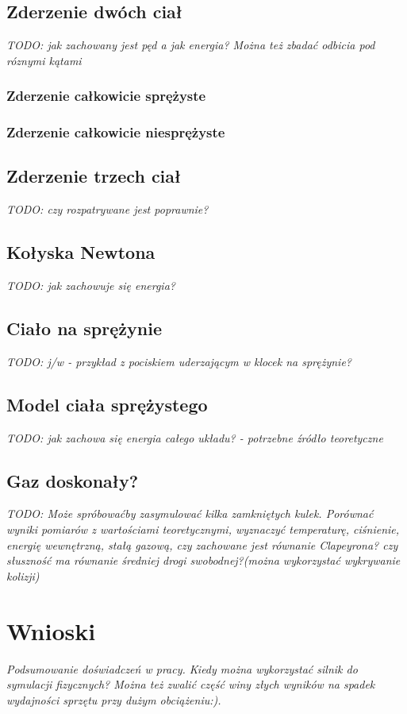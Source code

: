 \subsection{Zderzenie dwóch ciał}
\emph{TODO: jak zachowany jest pęd a jak energia? Można też zbadać odbicia pod
róznymi kątami}

\subsubsection{Zderzenie całkowicie sprężyste}

\subsubsection{Zderzenie całkowicie niesprężyste}

\subsection{Zderzenie trzech ciał}
\emph{TODO: czy rozpatrywane jest poprawnie?}


\subsection{Kołyska Newtona}
\emph{TODO: jak zachowuje się energia?}

\subsection{Ciało na sprężynie}
\emph{TODO: j/w - przykład z pociskiem uderzającym w klocek na sprężynie?}

\subsection{Model ciała sprężystego}
\emph{TODO: jak zachowa się energia całego układu? - potrzebne źródło
teoretyczne}

\subsection{Gaz doskonały?}
\emph{TODO: Może spróbowaćby zasymulować kilka zamkniętych kulek. Porównać
wyniki pomiarów z wartościami teoretycznymi, wyznaczyć temperaturę, ciśnienie,
energię wewnętrzną, stałą gazową, czy zachowane jest równanie Clapeyrona? czy
słuszność ma równanie średniej drogi swobodnej?(można wykorzystać wykrywanie
kolizji)}

\newpage
\section{Wnioski}
\emph{Podsumowanie doświadczeń w pracy. Kiedy można wykorzystać silnik do
symulacji fizycznych? Można też zwalić część winy złych wyników na spadek
wydajności sprzętu przy dużym obciążeniu:).}
